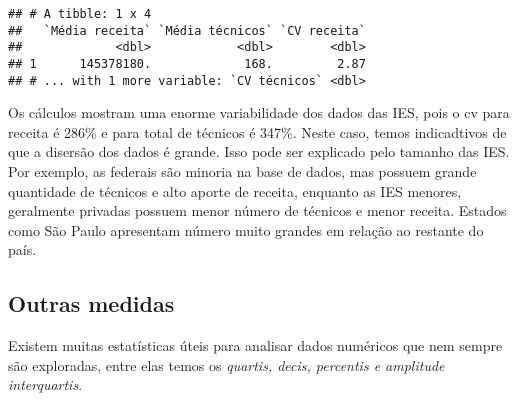 \documentclass[12pt,]{style/krantz}
\makeatletter
\newenvironment{Shaded}{\begin{snugshade}}{\end{snugshade}}
\newcommand{\DataTypeTok}[1]{\textcolor[rgb]{0.13,0.29,0.53}{#1}}
\newcommand{\DecValTok}[1]{\textcolor[rgb]{0.00,0.00,0.81}{#1}}
\newcommand{\KeywordTok}[1]{\textcolor[rgb]{0.13,0.29,0.53}{\textbf{#1}}}
\newcommand{\NormalTok}[1]{#1}
\newcommand{\OperatorTok}[1]{\textcolor[rgb]{0.81,0.36,0.00}{\textbf{#1}}}
\newcommand{\StringTok}[1]{\textcolor[rgb]{0.31,0.60,0.02}{#1}}
\newenvironment{kframe}{%
\medskip{}
\setlength{\fboxsep}{.8em}
 \def\at@end@of@kframe{}%
 \ifinner\ifhmode%
  \def\at@end@of@kframe{\end{minipage}}%
  \begin{minipage}{\columnwidth}%
 \fi\fi%
 \def\FrameCommand##1{\hskip\@totalleftmargin \hskip-\fboxsep
 \colorbox{shadecolor}{##1}\hskip-\fboxsep
     \hskip-\linewidth \hskip-\@totalleftmargin \hskip\columnwidth}%
 \MakeFramed {\advance\hsize-\width
   \@totalleftmargin\z@ \linewidth\hsize
   \@setminipage}}%
 {\par\unskip\endMakeFramed%
 \at@end@of@kframe}
\renewenvironment{Shaded}{\begin{kframe}}{\end{kframe}}
\theoremstyle{definition}
\theoremstyle{definition}
\theoremstyle{definition}
\theoremstyle{remark}
\makeatother
\begin{document}
\begin{Shaded}
\end{Shaded}

\begin{verbatim}
## # A tibble: 1 x 4
##   `Média receita` `Média técnicos` `CV receita`
##             <dbl>            <dbl>        <dbl>
## 1      145378180.             168.         2.87
## # ... with 1 more variable: `CV técnicos` <dbl>
\end{verbatim}

Os cálculos mostram uma enorme variabilidade dos dados das IES, pois o cv para receita é 286\% e para total de técnicos é 347\%. Neste caso, temos indicadtivos de que a disersão dos dados é grande. Isso pode ser explicado pelo tamanho das IES. Por exemplo, as federais são minoria na base de dados, mas possuem grande quantidade de técnicos e alto aporte de receita, enquanto as IES menores, geralmente privadas possuem menor número de técnicos e menor receita. Estados como São Paulo apresentam número muito grandes em relação ao restante do país.

\hypertarget{outras-medidas}{%
\subsection{Outras medidas}\label{outras-medidas}}

Existem muitas estatísticas úteis para analisar dados numéricos que nem sempre são exploradas, entre elas temos os \emph{quartis, decis, percentis e amplitude interquartis}.
\end{document}
